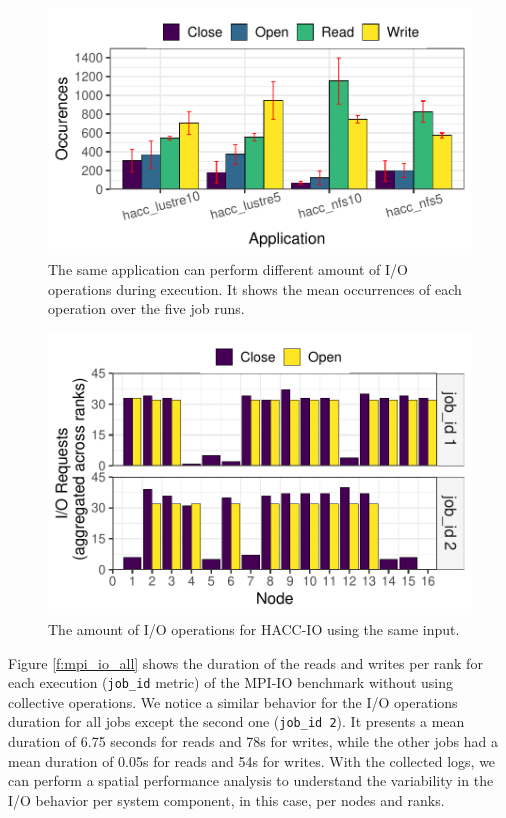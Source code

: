 \begin{figure}
	\centering
        \includegraphics[width=\linewidth]{figs/operations_hacc.pdf}
	\caption{The same application can perform different amount of
          I/O operations during execution. It shows the mean
          occurrences of each operation over the five job runs.}
	\label{f:hacc}
\end{figure}

\begin{figure}
	\centering
        \includegraphics[width=\linewidth]{figs/hacc_nfs_10.pdf}
	\caption{The amount of I/O operations for HACC-IO using the same input.}
	\label{f:hacc2}
\end{figure}

Figure \ref{f:mpi_io_all} shows the duration of the reads and writes
per rank for each execution (\texttt{job\_id} metric) of the MPI-IO
benchmark without using collective operations. We notice a similar
behavior for the I/O operations duration for all jobs except the
second one (\texttt{job\_id 2}). It presents a mean duration of 6.75
seconds for reads and 78s for writes, while the other jobs had a mean
duration of 0.05s for reads and 54s for writes. With the collected
logs, we can perform a spatial performance analysis to understand the
variability in the I/O behavior per system component, in this case,
per nodes and ranks.
      
